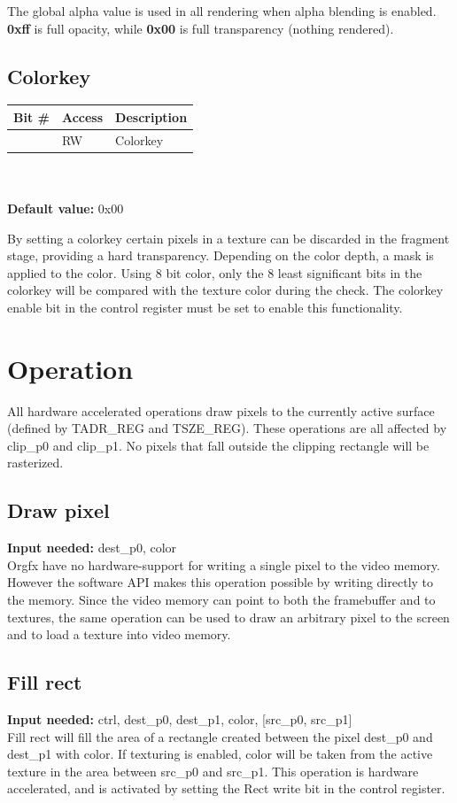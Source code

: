 \documentclass[10pt,a4paper]{article}
\begin{document}
The global alpha value is used in all rendering when alpha blending is enabled. \textbf{0xff} is full opacity, while \textbf{0x00} is full transparency (nothing rendered).

\subsection{Colorkey}
\begin{tabular}{|l|l|l|}
\hline \textbf{Bit \#} & \textbf{Access} & \textbf{Description} \\ 
\hline
\hline [31:0] & RW & Colorkey \\
\hline 
\end{tabular}
\\\\
\textbf{Default value:} 0x00

By setting a colorkey certain pixels in a texture can be discarded in the fragment stage, providing a hard transparency. Depending on the color depth, a mask is applied to the color. Using 8 bit color, only the 8 least significant bits in the colorkey will be compared with the texture color during the check. The colorkey enable bit in the control register must be set to enable this functionality.

\section{Operation}
All hardware accelerated operations draw pixels to the currently active surface (defined by TADR\_REG and TSZE\_REG). These operations are all affected by clip\_p0 and clip\_p1. No pixels that fall outside the clipping rectangle will be rasterized.

\subsection{Draw pixel}
\textbf{Input needed:} dest\_p0, color\\
Orgfx have no hardware-support for writing a single pixel to the video memory. However the software API makes this operation possible by writing directly to the memory. Since the video memory can point to both the framebuffer and to textures, the same operation can be used to draw an arbitrary pixel to the screen and to load a texture into video memory.

\subsection{Fill rect}
\textbf{Input needed:} ctrl, dest\_p0, dest\_p1, color, [src\_p0, src\_p1]\\
Fill rect will fill the area of a rectangle created between the pixel dest\_p0 and  dest\_p1 with color. If texturing is enabled, color will be taken from the active texture in the area between src\_p0 and src\_p1. This operation is hardware accelerated, and is activated by setting the Rect write bit in the control register.
\end{document}
